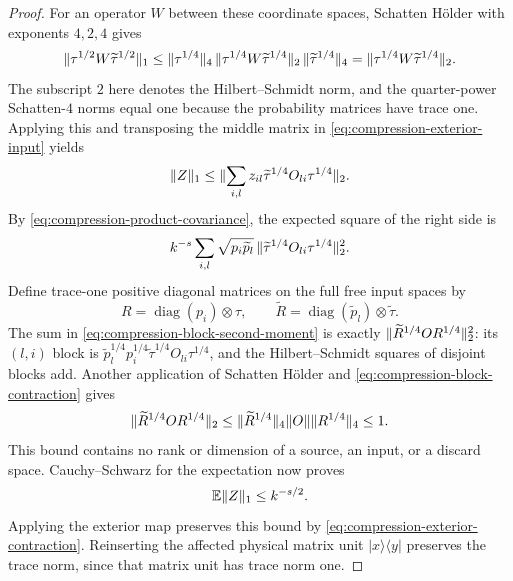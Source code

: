 \begin{proof}
For an operator $W$ between these coordinate spaces, Schatten
H\"older with exponents $4,2,4$ gives
\begin{equation}
 \lVert \tau^{1/2}W\widetilde\tau^{1/2}\rVert_1
 \le\lVert \tau^{1/4}\rVert_4\,
       \lVert \tau^{1/4}W\widetilde\tau^{1/4}\rVert_2\,
       \lVert \widetilde\tau^{1/4}\rVert_4
 =\lVert \tau^{1/4}W\widetilde\tau^{1/4}\rVert_2.
 \label{eq:compression-quarter-powers}
\end{equation}
The subscript $2$ here denotes the Hilbert--Schmidt norm, and the
quarter-power Schatten-$4$ norms equal one because the probability
matrices have trace one.  Applying this and transposing the middle
matrix in \eqref{eq:compression-exterior-input} yields
\[
 \lVert Z\rVert_1\le
 \lVert \sum_{i,l}z_{il}
             \widetilde\tau^{1/4}O_{li}\tau^{1/4}\rVert_2.
\]
By \eqref{eq:compression-product-covariance}, the expected square of
the right side is
\begin{equation}
 k^{-s}\sum_{i,l}\sqrt{p_i\widetilde p_l}\,
          \lVert \widetilde\tau^{1/4}O_{li}\tau^{1/4}\rVert_2^2.
 \label{eq:compression-block-second-moment}
\end{equation}
Define trace-one positive diagonal matrices on the full free input
spaces by
\[
 R=\operatorname{diag}(p_i)\otimes\tau,
 \qquad
 \widetilde R=\operatorname{diag}(\widetilde p_l)
                                      \otimes\widetilde\tau.
\]
The sum in \eqref{eq:compression-block-second-moment} is exactly
$\lVert \widetilde R^{1/4}OR^{1/4}\rVert_2^2$: its $(l,i)$ block is
$\widetilde p_l^{1/4}p_i^{1/4}
 \widetilde\tau^{1/4}O_{li}\tau^{1/4}$, and the
Hilbert--Schmidt squares of disjoint blocks add.  Another application
of Schatten H\"older and \eqref{eq:compression-block-contraction} gives
\begin{equation}
 \lVert \widetilde R^{1/4}OR^{1/4}\rVert_2
   \le\lVert \widetilde R^{1/4}\rVert_4\lVert O\rVert\lVert R^{1/4}\rVert_4
   \le1.
 \label{eq:compression-dimension-free}
\end{equation}
This bound contains no rank or dimension of a source, an input, or a
discard space.  Cauchy--Schwarz for the expectation now proves
\begin{equation}
 \mathbb E\lVert Z\rVert_1\le k^{-s/2}.
 \label{eq:compression-one-choice}
\end{equation}
Applying the exterior map preserves this bound by
\eqref{eq:compression-exterior-contraction}.  Reinserting the affected
physical matrix unit $|x\rangle\langle y|$ preserves the trace norm,
since that matrix unit has trace norm one.


\end{proof}
